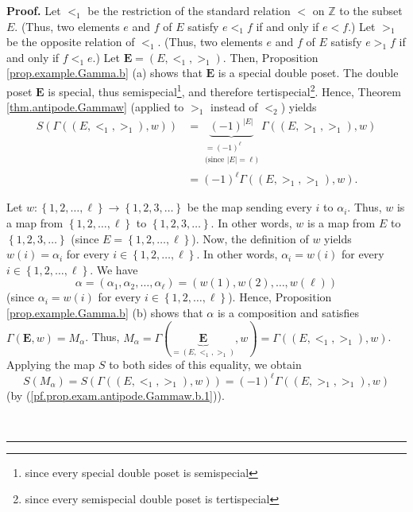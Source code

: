 \documentclass[numbers=enddot,12pt,final,onecolumn,notitlepage,abstracton]{scrartcl}
\theoremstyle{definition}
\newenvironment{proof}[1][Proof]{\noindent\textbf{#1.} }{\ \rule{0.5em}{0.5em}}
\newenvironment{verlong}{}{}
\begin{document}
\begin{verlong}
\begin{footnotesize}
\begin{proof}
Let $<_{1}$ be the restriction of the standard relation $<$ on $\mathbb{Z}$ to
the subset $E$. (Thus, two elements $e$ and $f$ of $E$ satisfy $e<_{1}f$ if
and only if $e<f$.) Let $>_{1}$ be the opposite relation of $<_{1}$. (Thus,
two elements $e$ and $f$ of $E$ satisfy $e>_{1}f$ if and only if $f<_{1}e$.)
Let ${\mathbf{E}}=\left(  E,<_{1},>_{1}\right)  $. Then, Proposition
\ref{prop.example.Gamma.b} (a) shows that $\mathbf{E}$ is a special double
poset. The double poset $\mathbf{E}$ is special, thus
semispecial\footnote{since every special double poset is semispecial}, and
therefore tertispecial\footnote{since every semispecial double poset is
tertispecial}. Hence, Theorem \ref{thm.antipode.Gammaw} (applied to $>_{1}$
instead of $<_{2}$) yields%
\begin{align}
S\left(  \Gamma\left(  \left(  E,<_{1},>_{1}\right)  ,w\right)  \right)   &
=\underbrace{\left(  -1\right)  ^{\left\vert E\right\vert }}%
_{\substack{=\left(  -1\right)  ^{\ell}\\\text{(since }\left\vert E\right\vert
=\ell\text{)}}}\Gamma\left(  \left(  E,>_{1},>_{1}\right)  ,w\right)
\nonumber\\
&  =\left(  -1\right)  ^{\ell}\Gamma\left(  \left(  E,>_{1},>_{1}\right)
,w\right)  . \label{pf.prop.exam.antipode.Gammaw.b.1}%
\end{align}


Let $w:\left\{  1,2,\ldots,\ell\right\}  \rightarrow\left\{  1,2,3,\ldots
\right\}  $ be the map sending every $i$ to $\alpha_{i}$. Thus, $w$ is a map
from $\left\{  1,2,\ldots,\ell\right\}  $ to $\left\{  1,2,3,\ldots\right\}
$. In other words, $w$ is a map from $E$ to $\left\{  1,2,3,\ldots\right\}  $
(since $E=\left\{  1,2,\ldots,\ell\right\}  $). Now, the definition of $w$
yields $w\left(  i\right)  =\alpha_{i}$ for every $i\in\left\{  1,2,\ldots
,\ell\right\}  $. In other words, $\alpha_{i}=w\left(  i\right)  $ for every
$i\in\left\{  1,2,\ldots,\ell\right\}  $. We have%
\[
\alpha=\left(  \alpha_{1},\alpha_{2},\ldots,\alpha_{\ell}\right)  =\left(
w\left(  1\right)  ,w\left(  2\right)  ,\ldots,w\left(  \ell\right)  \right)
\]
(since $\alpha_{i}=w\left(  i\right)  $ for every $i\in\left\{  1,2,\ldots
,\ell\right\}  $). Hence, Proposition \ref{prop.example.Gamma.b} (b) shows
that $\alpha$ is a composition and satisfies $\Gamma\left(  {\mathbf{E}%
},w\right)  =M_{\alpha}$. Thus, $M_{\alpha}=\Gamma\left(
\underbrace{{\mathbf{E}}}_{=\left(  E,<_{1},>_{1}\right)  },w\right)
=\Gamma\left(  \left(  E,<_{1},>_{1}\right)  ,w\right)  $. Applying the map
$S$ to both sides of this equality, we obtain%
\begin{equation}
S\left(  M_{\alpha}\right)  =S\left(  \Gamma\left(  \left(  E,<_{1}%
,>_{1}\right)  ,w\right)  \right)  =\left(  -1\right)  ^{\ell}\Gamma\left(
\left(  E,>_{1},>_{1}\right)  ,w\right)
\label{pf.prop.exam.antipode.Gammaw.b.2}%
\end{equation}
(by (\ref{pf.prop.exam.antipode.Gammaw.b.1})).


\end{proof}
\end{footnotesize}
\end{verlong}
\end{document}
